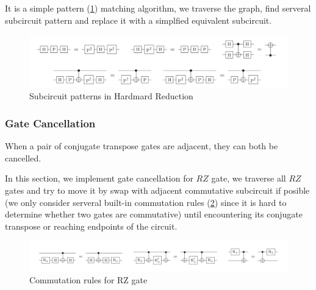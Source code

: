     It is a simple pattern (\ref{pattern}) matching algorithm, we traverse the graph, find serveral subcircuit pattern and replace it with a simplfied equivalent subcircuit.


    \begin{center}
        \begin{figure}
            \label{pattern}
            \centering
            \includegraphics[width=0.9\linewidth]{images/hardmard_reduction.png}
            \caption{Subcircuit patterns in Hardmard Reduction}
        \end{figure}
    \end{center}

    \subsubsection{Gate Cancellation}
    When a pair of conjugate transpose gates are adjacent, they can both be cancelled.

    In this section, we implement gate cancellation for $RZ$ gate, we traverse all $RZ$ gates and try to move it by swap with adjacent commutative subcircuit if posible (we only consider serveral  built-in commutation rules (\ref{commutation}) since it is hard to determine whether two gates are commutative) until encountering its conjugate transpose or reaching endpoints of the circuit.

    \begin{center}
        \begin{figure}
            \label{commutation}
            \centering
            \includegraphics[width=0.9\linewidth]{images/gate_cancellation.png}
            \caption{Commutation rules for RZ gate}
        \end{figure}
    \end{center}

